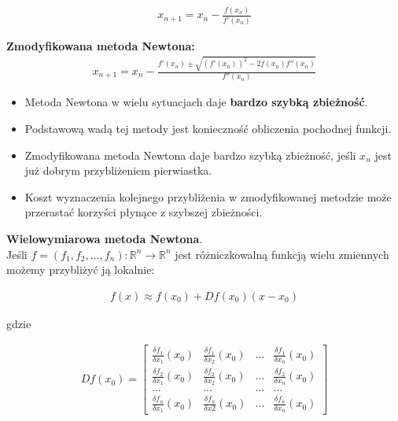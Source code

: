 \documentclass[main.tex]{subfiles}
\begin{document}
    \begin{align*}
        x_{n+1} = x_n - \frac{f(x_n)}{f'(x_n)}
    \end{align*}

    \textbf{Zmodyfikowana metoda Newtona:}
    \begin{align*}
        x_{n+1} = x_n - \frac{f'(x_n) \pm \sqrt{(f'(x_n))^2 - 2f(x_n)f''(x_n)}}{f''(x_n)}
    \end{align*}


    \begin{itemize}
        \item Metoda Newtona w wielu sytuacjach daje \textbf{bardzo szybką zbieżność}.
        \item Podstawową wadą tej metody jest konieczność obliczenia pochodnej funkcji.
        \item Zmodyfikowana metoda Newtona daje bardzo szybką zbieżność, jeśli $x_n$ jest już dobrym przybliżeniem
        pierwiastka.
        \item Koszt wyznaczenia kolejnego przybliżenia w zmodyfikowanej metodzie może przerastać korzyści płynące
        z szybszej zbieżności.
    \end{itemize}

    \textbf{Wielowymiarowa metoda Newtona}.\\

    Jeśli $f = (f_1, f_2, \dots, f_n): \mathbb{R}^n \rightarrow \mathbb{R}^n$ jest różniczkowalną funkcją wielu zmiennych
    możemy przybliżyć ją lokalnie:

    \begin{align*}
        f(x) \approx f(x_0) + Df(x_0)(x - x_0)
    \end{align*}

    gdzie

    \begin{align*}
        Df(x_0) =
        \begin{bmatrix}
            \frac{\delta f_1}{\delta x_1}(x_0) & \frac{\delta f_1}{\delta x_2}(x_0) & \dots & \frac{\delta f_1}{\delta x_n}(x_0)\\
            \frac{\delta f_2}{\delta x_1}(x_0) & \frac{\delta f_2}{\delta x_2}(x_0) & \dots & \frac{\delta f_2}{\delta x_n}(x_0)\\
            \dots & \dots & \dots & \dots\\
            \frac{\delta f_n}{\delta x_1}(x_0) & \frac{\delta f_n}{\delta x2}(x_0) & \dots & \frac{\delta f_n}{\delta x_n}(x_0)
        \end{bmatrix}
    \end{align*}
\end{document}
